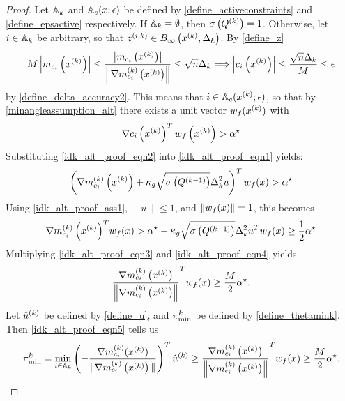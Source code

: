 \begin{proof}
Let ${\mathbb A_{k}}$ and ${\mathbb A_c}(x; \epsilon)$
be defined by
\cref{define_activeconstraints} and \cref{define_epsactive}
respectively.
If ${\mathbb A_{k}} = \emptyset$, then $\sigma\left({Q^{(k)}}\right) = 1$.
Otherwise, let $i \in {\mathbb A_{k}}$ be arbitrary,
so that ${z^{(i, k)}} \in { B_{\infty}\left(x^{(k)}, \Delta_k\right) }$. By \cref{define_z}
\begin{align*}
M \left|m_{c_i}\left(x^{(k)}\right)\right| \le \frac{\left|m_{c_i}\left(x^{(k)}\right)\right|}{\left\|{\nabla m_{c_i}^{(k)}\left(x^{(k)}\right)}\right\|} \le \sqrt{n} \Delta_k \Longrightarrow
\left|c_i\left(x^{(k)}\right)\right| \le \frac{\sqrt{n}\Delta_k}{M} \le \epsilon
\end{align*}
by \cref{define_delta_accuracy2}.
This means that $i \in {\mathbb A_c}(x^{(k)}; \epsilon)$, so that by \cref{minangleassumption_alt} there exists a unit vector ${w_f}(x^{(k)})$ with
\begin{align}
\nabla c_i\left(x^{(k)}\right)^T{w_f}\left(x^{(k)}\right) > { \alpha^{\star} } \label{idk_alt_proof_eqn1}
\end{align}
Substituting \cref{idk_alt_proof_eqn2} into \cref{idk_alt_proof_eqn1} yields:
\begin{align*}
\left({\nabla m_{c_i}^{(k)}\left(x^{(k)}\right)} + \kappa_g \sqrt{\sigma\left( Q^{(k-1)} \right)}\Delta_k^2 u\right)^T {w_f}(x) > { \alpha^{\star} }
\end{align*}
Using \cref{idk_alt_proof_ass1}, $\|u\|\le 1$, and $\|{w_f}(x)\| = 1$, this becomes
\begin{align}
{\nabla m_{c_i}^{(k)}\left(x^{(k)}\right)}^T{w_f}(x) > { \alpha^{\star} } - \kappa_g \sqrt{\sigma\left( Q^{(k-1)} \right)}\Delta_k^2 u^T{w_f}(x) \ge \frac 1 2 { \alpha^{\star} } \label{idk_alt_proof_eqn3}
\end{align}
Multiplying \cref{idk_alt_proof_eqn3} and \cref{idk_alt_proof_eqn4} yields
\begin{align}
\frac{{\nabla m_{c_i}^{(k)}\left(x^{(k)}\right)}}{\left\|{\nabla m_{c_i}^{(k)}\left(x^{(k)}\right)}\right\|}^T  {w_f}(x) \ge \frac M 2 { \alpha^{\star} }. \label{idk_alt_proof_eqn5}
\end{align}
Let ${{\hat u}^{(k)}}$ be defined by \cref{define_u}, 
and ${\pi^k_{\textrm{min}}}$ be defined by \cref{define_thetamink}.
Then \cref{idk_alt_proof_eqn5} tells us 
\begin{align*}
{\pi^k_{\textrm{min}}} = \min_{i \in {\mathbb A_{k}}} \left(-{\frac{\nabla m^{(k)}_{c_i}(x^{(k)})}{\|\nabla m^{(k)}_{c_i}\left(x^{(k)}\right)\|}}\right)^T {{\hat u}^{(k)}} \ge \frac{{\nabla m_{c_i}^{(k)}\left(x^{(k)}\right)}}{\left\|{\nabla m_{c_i}^{(k)}\left(x^{(k)}\right)}\right\|}^T {w_f}(x) \ge \frac M 2 { \alpha^{\star} }.
\end{align*}


\end{proof}
